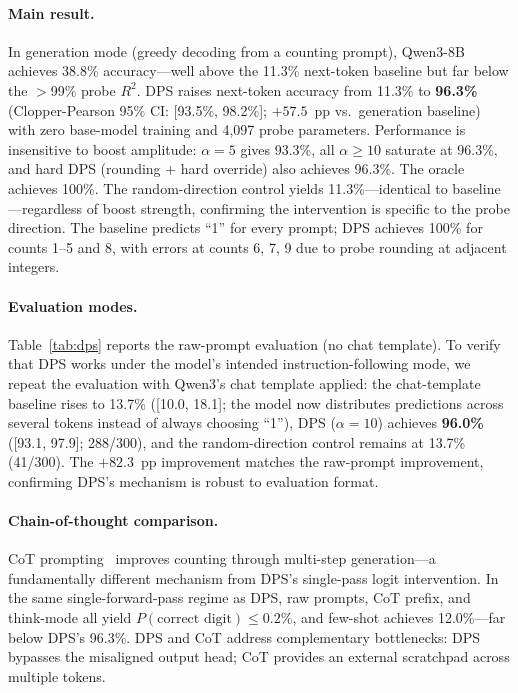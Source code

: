 \documentclass{article}
\begin{document}
\paragraph{Main result.}
In generation mode (greedy decoding from a counting prompt), Qwen3-8B achieves 38.8\%
accuracy---well above the 11.3\% next-token baseline but far below the $>$99\% probe $R^2$.
DPS raises next-token accuracy from 11.3\% to \textbf{96.3\%}
(Clopper-Pearson 95\% CI: [93.5\%, 98.2\%]; $+57.5$~pp vs.\ generation baseline)
with zero base-model training and 4{,}097 probe parameters.
Performance is insensitive to boost amplitude: $\alpha=5$ gives 93.3\%, all $\alpha \geq 10$
saturate at 96.3\%, and hard DPS (rounding + hard override) also achieves 96.3\%.
The oracle achieves 100\%.
The random-direction control yields 11.3\%---identical to baseline---regardless
of boost strength, confirming the intervention is specific to the probe direction.
The baseline predicts ``1'' for every prompt; DPS achieves 100\% for counts 1--5 and 8,
with errors at counts 6, 7, 9 due to probe rounding at adjacent integers.

\paragraph{Evaluation modes.}
Table~\ref{tab:dps} reports the raw-prompt evaluation (no chat template).
To verify that DPS works under the model's intended instruction-following mode,
we repeat the evaluation with Qwen3's chat template applied:
the chat-template baseline rises to 13.7\% ([10.0, 18.1]; the model now distributes
predictions across several tokens instead of always choosing ``1''),
DPS ($\alpha{=}10$) achieves \textbf{96.0\%} ([93.1, 97.9]; 288/300),
and the random-direction control remains at 13.7\% (41/300).
The $+82.3$~pp improvement matches the raw-prompt improvement, confirming DPS's
mechanism is robust to evaluation format.

\paragraph{Chain-of-thought comparison.}
CoT prompting~\citep{wei2022chain} improves counting through multi-step generation---a
fundamentally different mechanism from DPS's single-pass logit intervention.
In the same single-forward-pass regime as DPS, raw prompts, CoT prefix, and think-mode
all yield $P(\text{correct digit}) \leq 0.2\%$, and few-shot achieves 12.0\%---far below DPS's 96.3\%.
DPS and CoT address complementary bottlenecks: DPS bypasses the misaligned output head;
CoT provides an external scratchpad across multiple tokens.
\end{document}
